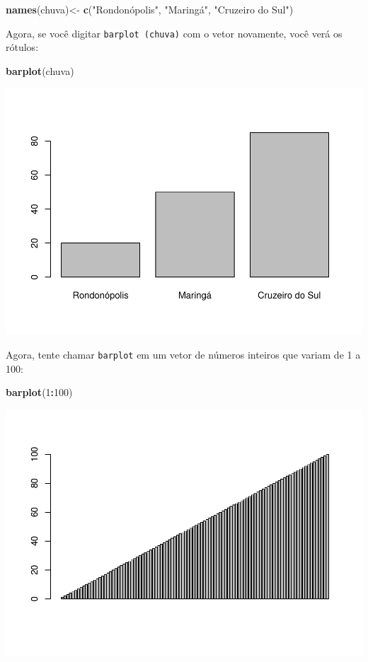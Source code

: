 \documentclass[]{book}
\newenvironment{Shaded}{\begin{snugshade}}{\end{snugshade}}
\newcommand{\DecValTok}[1]{\textcolor[rgb]{0.00,0.00,0.81}{#1}}
\newcommand{\KeywordTok}[1]{\textcolor[rgb]{0.13,0.29,0.53}{\textbf{#1}}}
\newcommand{\NormalTok}[1]{#1}
\newcommand{\OperatorTok}[1]{\textcolor[rgb]{0.81,0.36,0.00}{\textbf{#1}}}
\newcommand{\StringTok}[1]{\textcolor[rgb]{0.31,0.60,0.02}{#1}}
\begin{document}
\begin{Shaded}
\begin{Highlighting}[]
\KeywordTok{names}\NormalTok{(chuva)<-}\StringTok{ }\KeywordTok{c}\NormalTok{(}\StringTok{"Rondonópolis", "}\NormalTok{Maringá}\StringTok{", "}\NormalTok{Cruzeiro do Sul}\StringTok{")}
\end{Highlighting}
\end{Shaded}

Agora, se você digitar \texttt{barplot\ (chuva)} com o vetor novamente, você verá os rótulos:

\begin{Shaded}
\begin{Highlighting}[]
\KeywordTok{barplot}\NormalTok{(chuva)}
\end{Highlighting}
\end{Shaded}

\includegraphics{TudodoR_files/figure-latex/unnamed-chunk-34-1.pdf}

Agora, tente chamar \texttt{barplot} em um vetor de números inteiros que variam de 1 a 100:

\begin{Shaded}
\begin{Highlighting}[]
\KeywordTok{barplot}\NormalTok{(}\DecValTok{1}\OperatorTok{:}\DecValTok{100}\NormalTok{)}
\end{Highlighting}
\end{Shaded}

\includegraphics{TudodoR_files/figure-latex/unnamed-chunk-35-1.pdf}
\end{document}
